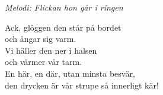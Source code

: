 {\footnotesize\textit{Melodi: Flickan hon går i ringen}}\par
\vspace{10pt}
Ack, glöggen den står på bordet\\
och ångar sig varm.\\
Vi häller den ner i halsen \\
och värmer vår tarm.\\
En här, en där, utan minsta besvär,\\
den drycken är vår strupe så innerligt kär!
